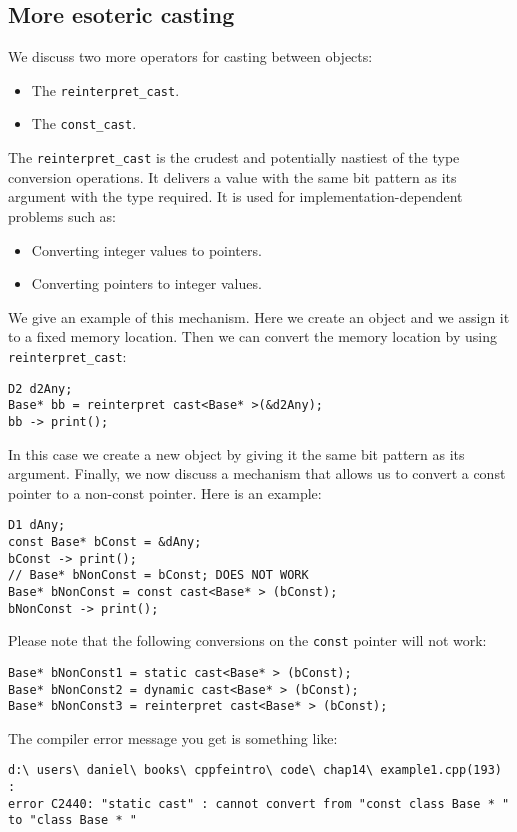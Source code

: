 \subsection{More esoteric casting}

We discuss two more operators for casting between objects:
\begin{itemize}
	\item The \texttt{reinterpret\_cast}.
	\item The \texttt{const\_cast}.
\end{itemize}
The \texttt{reinterpret\_cast} is the crudest and potentially nastiest of the type conversion operations. It delivers a value with the same bit pattern as its argument with the type required. It is used for implementation-dependent problems such as:
\begin{itemize}
	\item Converting integer values to pointers.
	\item Converting pointers to integer values.
\end{itemize}
We give an example of this mechanism. Here we create an object and we assign it to a fixed memory location. Then we can convert the memory location by using \texttt{reinterpret\_cast}:
\begin{lstlisting}
D2 d2Any;
Base* bb = reinterpret cast<Base* >(&d2Any);
bb -> print();
\end{lstlisting}
In this case we create a new object by giving it the same bit pattern as its argument. Finally, we now discuss a mechanism that allows us to convert a const pointer to a non-const pointer. Here is an example:
\begin{lstlisting}
D1 dAny;
const Base* bConst = &dAny;
bConst -> print();
// Base* bNonConst = bConst; DOES NOT WORK
Base* bNonConst = const cast<Base* > (bConst);
bNonConst -> print();
\end{lstlisting}
Please note that the following conversions on the \texttt{const} pointer will not work:
\begin{lstlisting}
Base* bNonConst1 = static cast<Base* > (bConst);
Base* bNonConst2 = dynamic cast<Base* > (bConst);
Base* bNonConst3 = reinterpret cast<Base* > (bConst);
\end{lstlisting}
The compiler error message you get is something like:
\begin{lstlisting}
d:\ users\ daniel\ books\ cppfeintro\ code\ chap14\ example1.cpp(193) :
error C2440: "static cast" : cannot convert from "const class Base * "
to "class Base * "
\end{lstlisting}

